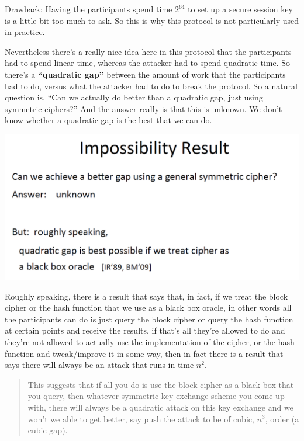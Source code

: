 \documentclass[11pt]{article}
\makeatletter
\def\maxwidth{\ifdim\Gin@nat@width>\linewidth\linewidth
    \else\Gin@nat@width\fi}
\let\Oldincludegraphics\includegraphics
\renewcommand{\includegraphics}[1]{\Oldincludegraphics[width=.8\maxwidth]{#1}}
\makeatother
\begin{document}
Drawback: Having the participants spend time \(2^{64}\) to set up a
secure session key is a little bit too much to ask. So this is why this
protocol is not particularly used in practice.

Nevertheless there's a really nice idea here in this protocol that the
participants had to spend linear time, whereas the attacker had to spend
quadratic time. So there's a \textbf{``quadratic gap''} between the
amount of work that the participants had to do, versus what the attacker
had to do to break the protocol. So a natural question is, ``Can we
actually do better than a quadratic gap, just using symmetric ciphers?''
And the answer really is that this is unknown. We don't know whether a
quadratic gap is the best that we can do.

\includegraphics{./Images/ImpossibilityResult.png}

Roughly speaking, there is a result that says that, in fact, if we treat
the block cipher or the hash function that we use as a black box oracle,
in other words all the participants can do is just query the block
cipher or query the hash function at certain points and receive the
results, if that's all they're allowed to do and they're not allowed to
actually use the implementation of the cipher, or the hash function and
tweak/improve it in some way, then in fact there is a result that says
there will always be an attack that runs in time \(n^{2}\).

\begin{quote}
This suggests that if all you do is use the block cipher as a black box
that you query, then whatever symmetric key exchange scheme you come up
with, there will always be a quadratic attack on this key exchange and
we won't we able to get better, say push the attack to be of cubic,
\(n^{3}\), order (a cubic gap).
\end{quote}
\end{document}
